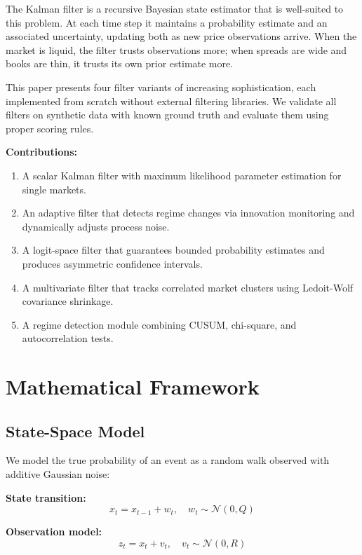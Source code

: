\documentclass[11pt, a4paper]{article}
\begin{document}
The Kalman filter \citep{kalman1960} is a recursive Bayesian state estimator that is well-suited to this problem. At each time step it maintains a probability estimate and an associated uncertainty, updating both as new price observations arrive. When the market is liquid, the filter trusts observations more; when spreads are wide and books are thin, it trusts its own prior estimate more.

This paper presents four filter variants of increasing sophistication, each implemented from scratch without external filtering libraries. We validate all filters on synthetic data with known ground truth and evaluate them using proper scoring rules.

\textbf{Contributions:}
\begin{enumerate}
    \item A scalar Kalman filter with maximum likelihood parameter estimation for single markets.
    \item An adaptive filter that detects regime changes via innovation monitoring and dynamically adjusts process noise.
    \item A logit-space filter that guarantees bounded probability estimates and produces asymmetric confidence intervals.
    \item A multivariate filter that tracks correlated market clusters using Ledoit-Wolf covariance shrinkage.
    \item A regime detection module combining CUSUM, chi-square, and autocorrelation tests.
\end{enumerate}

\section{Mathematical Framework}

\subsection{State-Space Model}

We model the true probability of an event as a random walk observed with additive Gaussian noise:

\textbf{State transition:}
\begin{equation}
    x_t = x_{t-1} + w_t, \quad w_t \sim \mathcal{N}(0, Q)
    \label{eq:state}
\end{equation}

\textbf{Observation model:}
\begin{equation}
    z_t = x_t + v_t, \quad v_t \sim \mathcal{N}(0, R)
    \label{eq:obs}
\end{equation}
\end{document}
